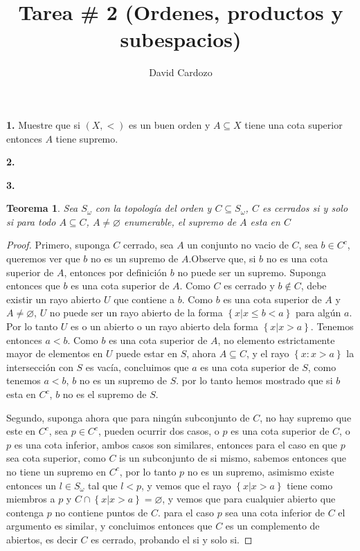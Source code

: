\documentclass[notitlepage]{article}
\author{David Cardozo}
\title{Tarea \# 2 (Ordenes, productos y subespacios)}
\newtheorem{thm}{Teorema}
\newcommand{\set}[1]{\left\lbrace #1 \right\rbrace}
\newcommand{\contained}{\subseteq}
\begin{document}
\maketitle

\textbf{1.} Muestre que si $ (X, < )$ es un buen orden y $A \contained X$ tiene una cota superior entonces $A$ tiene supremo.


\textbf{2.}


\textbf{3.}

\begin{thm}
	Sea $S_{\omega} $ con la topología del orden  y $ C \subseteq S_\omega $, $C $ es cerrados si y solo si para todo $A \contained C$, $ A \neq \varnothing$ enumerable, el supremo de $A$ esta en $C$
\end{thm}

\begin{proof}
	Primero, suponga $C$ cerrado, sea $A$ un conjunto no vacio de $C$, sea $b \in C^c$, queremos ver que $b$ no es un supremo de $A$.Observe que, si $b$ no es una cota superior de $A$, entonces por definición $b$ no puede ser un supremo. Suponga entonces que $b$ es una cota superior de $A$. Como $C$ es cerrado y $b \notin C$, debe existir un rayo abierto $U$ que contiene a $b$. Como $b$ es una cota superior de $A$ y $A \neq \varnothing$, $U$ no puede ser un rayo abierto de la forma $\set{x | x \leq b < a} $ para algún $a$. Por lo tanto $U$ es o un abierto o un rayo abierto dela forma $ \set{x | x > a} $. Tenemos entonces $ a < b$. Como $b$ es una cota superior de $A$, no elemento estrictamente mayor de elementos en $U$ puede estar en $S$, ahora $ A \contained C$, y el rayo $\set{x : x > a}$ la intersección con $S$ es vacía, concluimos que $a$ es una cota superior de $S$, como tenemos $ a < b$, $b$ no es un supremo de $S$. por lo tanto hemos mostrado que si $b$ esta en $C^c$, $b$ no es el supremo de $S$.
	
	 Segundo, suponga ahora que para ningún subconjunto de $C$, no hay supremo que este en $ C^c$, sea $ p \in C^c$, pueden ocurrir dos casos, o $p$ es una cota superior de $C$, o $p$ es una cota inferior, ambos casos son similares, entonces para el caso en que $p$ sea cota superior, como $C$ is un subconjunto de si mismo, sabemos entonces que no tiene un supremo en $C^c$, por lo tanto $p$ no es un supremo, asimismo existe entonces un $l \in S_\omega$ tal que $ l < p$, y vemos que el rayo $\set{x | x>a} $ tiene como miembros a $p$ y $ C \cap \set{x | x>a} = \varnothing $, y vemos que para cualquier abierto que contenga $p$ no contiene puntos de $C$. para el caso $p$ sea una cota inferior de $C$ el argumento es similar, y concluimos entonces que $C$ es un complemento de abiertos, es decir $C$ es cerrado, probando el si y solo si.
	 
\end{proof}
\end{document}
